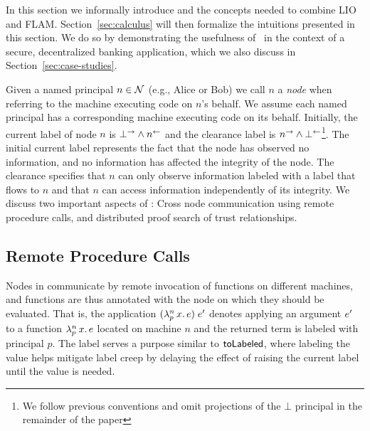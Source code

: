 In this section we informally introduce \lang{} and the concepts needed to combine LIO and FLAM. Section~\ref{sec:calculus} will then formalize the intuitions presented in this section. We do so by demonstrating the usefulness of \lang{}\ in the context of a secure, decentralized banking application, which we also discuss in Section~\ref{sec:case-studies}.

Given a named principal $n \in \mathcal{N}$ (e.g., Alice or Bob) we call $n$ a \emph{node} when referring to the machine executing code on $n$'s behalf. We assume each named principal has a corresponding machine executing code on its behalf. Initially, the current label of node $n$ is $\bot^{\rightarrow} \wedge n^{\leftarrow}$ and the clearance label is $n^{\rightarrow} \wedge \bot^{\leftarrow}$\footnote{We follow previous conventions \cite{Arden:2015:FA:2859845.2859998} and omit projections of the $\bot$ principal in the remainder of the paper}. The initial current label represents the fact that the node has observed no information, and no information has affected the integrity of the node. The clearance specifies that $n$ can only observe information labeled with a label that flows to $n$ and that $n$ can access information independently of its integrity. We discuss two important aspects of \lang: Cross node communication using remote procedure calls, and distributed proof search of trust relationships.

\subsection{Remote Procedure Calls}
Nodes in \lang{} communicate by remote invocation of functions on different machines, and functions are thus annotated with the node on which they should be evaluated. That is, the application $(\lambda^{n}_{p}\,x.\,e)\;e'$ denotes applying an argument $e'$ to a function $\lambda^{n}_{p}\,x.\,e$ located on machine $n$ and the returned term is labeled with principal $p$. The label serves a purpose similar to $\mathsf{toLabeled}$, where labeling the value helps mitigate label creep by delaying the effect of raising the current label until the value is needed.

